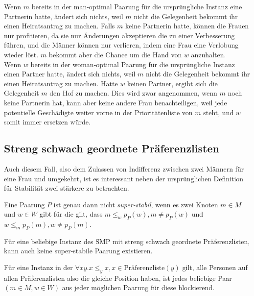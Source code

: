 \begin{Beweis}
\label{element_enfuegen_bew}
  Wenn $m$ bereits in der man-optimal Paarung für die ursprüngliche Instanz eine Partnerin hatte, ändert sich nichts, weil $m$ nicht die Gelegenheit bekommt ihr einen Heiratsantrag zu machen. Falls $m$ keine Partnerin hatte, können die Frauen nur profitieren, da sie nur Änderungen akzeptieren die zu einer Verbesserung führen, und die Männer können nur verlieren, indem eine Frau eine Verlobung wieder löst. $m$ bekommt aber die Chance um die Hand von $w$ anzuhalten.\\
  Wenn $w$ bereits in der woman-optimal Paarung für die ursprüngliche Instanz einen Partner hatte, ändert sich nichts, weil $m$ nicht die Gelegenheit bekommt ihr einen Heiratsantrag zu machen. Hatte $w$ keinen Partner, ergibt sich die Gelegenheit $m$ den Hof zu machen. Dies wird zwar angenommen, wenn $m$ noch keine Partnerin hat, kann aber keine andere Frau benachteiligen, weil jede potentielle Geschädigte weiter vorne in der Prioritätenliste von $m$ steht, und $w$ somit immer ersetzen würde.
\end{Beweis}

\subsection{Streng schwach geordnete Präferenzlisten}

Auch diesem Fall, also dem Zulassen von Indifferenz zwischen zwei Männern für eine Frau und umgekehrt, ist es interessant neben der ursprünglichen Definition für Stabilität zwei stärkere zu betrachten.

\begin{Definition}
\label{super-stabil}
  Eine Paarung $P$ ist genau dann nicht \textit{super-stabil}, wenn es zwei Knoten $m \in M$ und $w \in W$ gibt für die gilt, dass $m \leq_{w} p_{P}(w), m \neq p_{P}(w)$ und $w \leq_{m} p_{P}(m), w \neq p_{P}(m)$.
\end{Definition}

\begin{Proposition}
\label{keine_super-stabil}
  Für eine beliebige Instanz des SMP mit streng schwach geordnete Präferenzlisten, kann auch keine super-stabile Paarung existieren.
\end{Proposition}

\begin{Beweis}
\label{keine_super-stabil_bew}
  Für eine Instanz in der $\forall x y. x \leq_{y} x, x \in \textrm{Pr\"aferenzliste}(y)$ gilt, alle Personen auf allen Präferenzlisten also die gleiche Position haben, ist jedes beliebige Paar $(m \in M,w \in W)$ aus jeder möglichen Paarung für diese blockierend.
\end{Beweis}

